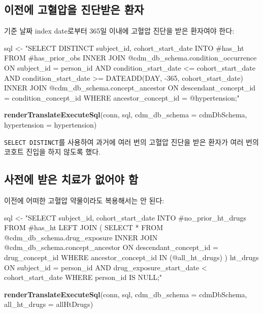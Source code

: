 \documentclass[10.5pt]{book}
\newenvironment{Shaded}{\begin{snugshade}}{\end{snugshade}}
\newcommand{\KeywordTok}[1]{\textcolor[rgb]{0.13,0.29,0.53}{\textbf{#1}}}
\newcommand{\DataTypeTok}[1]{\textcolor[rgb]{0.13,0.29,0.53}{#1}}
\newcommand{\StringTok}[1]{\textcolor[rgb]{0.31,0.60,0.02}{#1}}
\newcommand{\NormalTok}[1]{#1}
\theoremstyle{definition}
\theoremstyle{definition}
\theoremstyle{definition}
\theoremstyle{remark}
\begin{document}
\subsection{이전에 고혈압을 진단받은 환자}\label{---}

기준 날짜 index date로부터 365일 이내에 고혈압 진단을 받은 환자여야
한다:

\begin{Shaded}
\begin{Highlighting}[]
\NormalTok{sql <-}\StringTok{ "SELECT DISTINCT subject_id,}
\StringTok{  cohort_start_date}
\StringTok{INTO #has_ht}
\StringTok{FROM #has_prior_obs}
\StringTok{INNER JOIN @cdm_db_schema.condition_occurrence}
\StringTok{  ON subject_id = person_id}
\StringTok{    AND condition_start_date <= cohort_start_date}
\StringTok{    AND condition_start_date >= DATEADD(DAY, -365, cohort_start_date)}
\StringTok{INNER JOIN @cdm_db_schema.concept_ancestor}
\StringTok{  ON descendant_concept_id = condition_concept_id}
\StringTok{WHERE ancestor_concept_id = @hypertension;"}

\KeywordTok{renderTranslateExecuteSql}\NormalTok{(conn,}
\NormalTok{                          sql,}
                          \DataTypeTok{cdm_db_schema =}\NormalTok{ cdmDbSchema,}
                          \DataTypeTok{hypertension =}\NormalTok{ hypertension)}
\end{Highlighting}
\end{Shaded}

\texttt{SELECT\ DISTINCT}를 사용하여 과거에 여러 번의 고혈압 진단을 받은
환자가 여러 번의 코호트 진입을 하지 않도록 했다.

\subsection{사전에 받은 치료가 없어야 함}\label{----}

이전에 어떠한 고혈압 약물이라도 복용해서는 안 된다:

\begin{Shaded}
\begin{Highlighting}[]
\NormalTok{sql <-}\StringTok{ "SELECT subject_id,}
\StringTok{  cohort_start_date}
\StringTok{INTO #no_prior_ht_drugs}
\StringTok{FROM #has_ht}
\StringTok{LEFT JOIN (}
\StringTok{  SELECT *}
\StringTok{  FROM @cdm_db_schema.drug_exposure}
\StringTok{  INNER JOIN @cdm_db_schema.concept_ancestor}
\StringTok{    ON descendant_concept_id = drug_concept_id}
\StringTok{  WHERE ancestor_concept_id IN (@all_ht_drugs)}
\StringTok{) ht_drugs}
\StringTok{  ON subject_id = person_id}
\StringTok{    AND drug_exposure_start_date < cohort_start_date}
\StringTok{WHERE person_id IS NULL;"}

\KeywordTok{renderTranslateExecuteSql}\NormalTok{(conn,}
\NormalTok{                          sql,}
                          \DataTypeTok{cdm_db_schema =}\NormalTok{ cdmDbSchema,}
                          \DataTypeTok{all_ht_drugs =}\NormalTok{ allHtDrugs)}
\end{Highlighting}
\end{Shaded}
\end{document}
